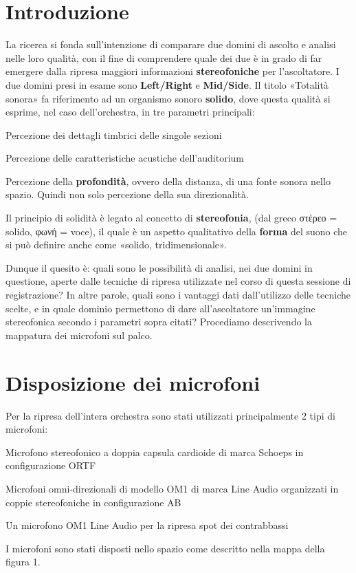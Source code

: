 
\section*{Introduzione}
La ricerca si fonda sull'intenzione di comparare due domini di ascolto e analisi nelle loro qualità, con il fine di comprendere quale dei due è in grado di far emergere dalla ripresa maggiori informazioni \textbf{stereofoniche} per l'ascoltatore.
I due domini presi in esame sono \textbf{Left/Right} e \textbf{Mid/Side}.
Il titolo «Totalità sonora» fa riferimento ad un organismo sonoro \textbf{solido}, dove questa qualità si esprime, nel caso dell'orchestra, in tre parametri principali:
\begin{compactitem} 
	\item Percezione dei dettagli timbrici delle singole sezioni
	\item Percezione delle caratteristiche  acustiche  dell'auditorium
	\item Percezione della \textbf{profondità}, ovvero della distanza, di una fonte sonora nello spazio. Quindi non solo percezione della sua direzionalità.
	\end{compactitem}
Il principio di solidità è legato al concetto di \textbf{stereofonia}, (dal greco στέρεο = solido, φωνή = voce), il quale è un aspetto qualitativo della \textbf{forma} del suono che si può definire anche come «solido, tridimensionale».

Dunque il quesito è: quali sono le possibilità di analisi, nei due domini in questione, aperte dalle tecniche di ripresa utilizzate nel corso di questa sessione di registrazione?
In altre parole, quali sono i vantaggi dati dall'utilizzo delle tecniche scelte, e in quale dominio permettono di dare all'ascoltatore un'immagine stereofonica secondo i parametri sopra citati?
Procediamo descrivendo la mappatura dei microfoni sul palco.

\section*{Disposizione dei microfoni}
Per la ripresa dell'intera orchestra sono stati utilizzati principalmente 2 tipi di microfoni:
\begin{compactitem} 
\item Microfono stereofonico a doppia capsula cardioide di marca Schoeps in configurazione ORTF
\item Microfoni omni-direzionali di modello OM1 di marca Line Audio organizzati in coppie stereofoniche in configurazione AB
\item Un microfono OM1 Line Audio per la ripresa spot dei contrabbassi
\end{compactitem}
I microfoni sono stati disposti nello spazio come descritto nella mappa della figura 1.


